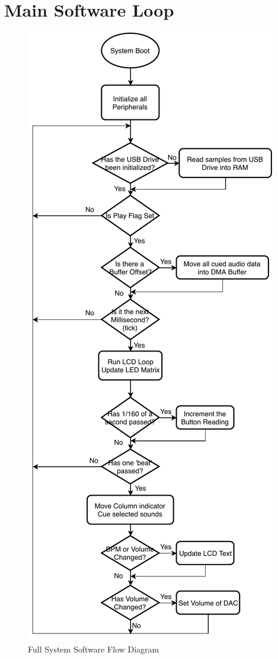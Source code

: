 \documentclass[12pt,a4paper]{report}
\begin{document}
\section{Main Software Loop}
\begin{figure}[h!]
	\centering
	\includegraphics[height = 0.62 \textheight, angle=0, origin=c]{NewFullSystemDiagram.pdf}
	\caption{Full System Software Flow Diagram}
	\label{fig:SysFlowDiag}
\end{figure}
\end{document}
